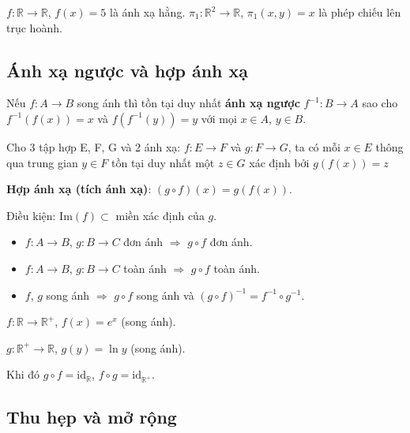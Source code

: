 \documentclass[12pt,a4paper]{article}
\begin{document}
\begin{vidu}
  $f: \mathbb{R} \to \mathbb{R}$, $f(x) = 5$ là ánh xạ hằng. $\pi_1: \mathbb{R}^2 \to \mathbb{R}$, $\pi_1(x,y) = x$ là phép chiếu lên trục hoành.
\end{vidu}

\subsection{Ánh xạ ngược và hợp ánh xạ}

\begin{dinhnghia}
  Nếu $f: A \to B$ song ánh thì tồn tại duy nhất \textbf{ánh xạ ngược} $f^{-1}: B \to A$ sao cho $f^{-1}(f(x)) = x$ và $f(f^{-1}(y)) = y$ với mọi $x \in A$, $y \in B$.
\end{dinhnghia}

\begin{dinhnghia}
  Cho 3 tập hợp E, F, G và 2 ánh xạ: $f: E \to F$ và $g: F \to G$, ta có mỗi $x \in E$ thông qua trung gian $y \in F$ tồn tại duy nhất một $z \in G$ xác định bởi $g(f(x)) = z$

  \textbf{Hợp ánh xạ (tích ánh xạ)}: $(g \circ f)(x) = g(f(x))$. 
  
  Điều kiện: $\mathrm{Im}(f) \subset$ miền xác định của $g$.
\end{dinhnghia}

\begin{tinhchat}[title={Tính chất hợp ánh xạ}]
  \begin{itemize}
    \item $f: A \to B$, $g: B \to C$ đơn ánh $\Rightarrow$ $g \circ f$ đơn ánh.
    \item $f: A \to B$, $g: B \to C$ toàn ánh $\Rightarrow$ $g \circ f$ toàn ánh.
    \item $f$, $g$ song ánh $\Rightarrow$ $g \circ f$ song ánh và $(g \circ f)^{-1} = f^{-1} \circ g^{-1}$.
  \end{itemize}
\end{tinhchat}

\begin{vidu}
  $f: \mathbb{R} \to \mathbb{R}^+$, $f(x) = e^x$ (song ánh). 
  
  $g: \mathbb{R}^+ \to \mathbb{R}$, $g(y) = \ln y$ (song ánh). 
  
  Khi đó $g \circ f = \mathrm{id}_\mathbb{R}$, $f \circ g = \mathrm{id}_{\mathbb{R}^+}$.
\end{vidu}

\subsection{Thu hẹp và mở rộng}
\end{document}

